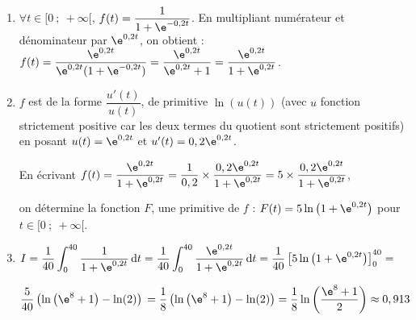 \begin{enumerate}
	\item $\forall t \in [0~;~+\infty[$, $f(t) = \dfrac{1}{1+ \e^{-0,2t}}$. En multipliant numérateur et dénominateur par $\e^{0,2t}$, on obtient : $f(t)=\dfrac{\e^{0,2t}}{\e^{0,2t}(1+ \e^{-0,2t})}= \dfrac{\e^{0,2t}}{\e^{0,2t} + 1} = \dfrac{\e^{0,2t}}{1 + \e^{0,2t}}$.
	\item $f$ est de la forme $\dfrac{u'(t)}{u(t)}$, de primitive $\ln(u(t))$ (avec $u$ fonction strictement positive car les deux termes du quotient sont strictement positifs) en posant $u(t)=\e^{0,2t}$ et $u'(t)= 0,2\e^{0,2t}$.

En écrivant $f(t)=\dfrac{\e^{0,2t}}{1 + \e^{0,2t}}=\dfrac{1}{0,2}\times \dfrac{0,2\e^{0,2t}}{1 + \e^{0,2t}}=5\times \dfrac{0,2\e^{0,2t}}{1 + \e^{0,2t}}$,

on détermine la fonction $F$, une primitive de $f$ : $F(t)= 5\ln\left(1 + \e^{0,2t}\right)$ pour $t \in [0~;~+\infty[$.
	\item $I = \dfrac{1}{40}\displaystyle\int_0^{40} \dfrac{1}{1 + \e^{0,2t}}\,\text{d}t = \dfrac{1}{40}\displaystyle\int_0^{40} \dfrac{\e^{0,2t}}{1 + \e^{0,2t}} \,\text{d}t =\dfrac{1}{40}\left[5\ln\left(1 + \e^{0,2t}\right)\right]_0^{40}=$

$\dfrac{5}{40}\left(\ln\left(\e^8+1\right)-\ln(2)\right)\\=\dfrac{1}{8}\left(\ln\left(\e^8+1\right)-\ln(2)\right)=\dfrac{1}{8} \ln\left(\dfrac{\e^8+1}{2}\right)\approx 0,913$
\end{enumerate}

